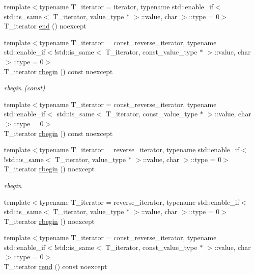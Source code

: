 \begin{DoxyCompactItemize}
{\footnotesize template$<$typename T\+\_\+iterator  = iterator, typename std\+::enable\+\_\+if$<$ std\+::is\+\_\+same$<$ T\+\_\+iterator, value\+\_\+type $\ast$ $>$\+::value, char $>$\+::type  = 0$>$ }\\T\+\_\+iterator \hyperlink{classIceBRG_1_1labeled__array__col__reference_a6a658c030fd15dc17e39542b80b78d4c}{end} () noexcept
\item 
{\footnotesize template$<$typename T\+\_\+iterator  = const\+\_\+reverse\+\_\+iterator, typename std\+::enable\+\_\+if$<$!std\+::is\+\_\+same$<$ T\+\_\+iterator, const\+\_\+value\+\_\+type $\ast$ $>$\+::value, char $>$\+::type  = 0$>$ }\\T\+\_\+iterator \hyperlink{classIceBRG_1_1labeled__array__col__reference_af2361ee6bb59b591e6df0149de8cede6}{rbegin} () const  noexcept
\begin{DoxyCompactList}\small\item\em rbegin (const) \end{DoxyCompactList}\item 
{\footnotesize template$<$typename T\+\_\+iterator  = const\+\_\+reverse\+\_\+iterator, typename std\+::enable\+\_\+if$<$ std\+::is\+\_\+same$<$ T\+\_\+iterator, const\+\_\+value\+\_\+type $\ast$ $>$\+::value, char $>$\+::type  = 0$>$ }\\T\+\_\+iterator \hyperlink{classIceBRG_1_1labeled__array__col__reference_af2361ee6bb59b591e6df0149de8cede6}{rbegin} () const  noexcept
\item 
{\footnotesize template$<$typename T\+\_\+iterator  = reverse\+\_\+iterator, typename std\+::enable\+\_\+if$<$!std\+::is\+\_\+same$<$ T\+\_\+iterator, value\+\_\+type $\ast$ $>$\+::value, char $>$\+::type  = 0$>$ }\\T\+\_\+iterator \hyperlink{classIceBRG_1_1labeled__array__col__reference_abaf079140281932aa7abdea39d6555c1}{rbegin} () noexcept
\begin{DoxyCompactList}\small\item\em rbegin \end{DoxyCompactList}\item 
{\footnotesize template$<$typename T\+\_\+iterator  = reverse\+\_\+iterator, typename std\+::enable\+\_\+if$<$ std\+::is\+\_\+same$<$ T\+\_\+iterator, value\+\_\+type $\ast$ $>$\+::value, char $>$\+::type  = 0$>$ }\\T\+\_\+iterator \hyperlink{classIceBRG_1_1labeled__array__col__reference_abaf079140281932aa7abdea39d6555c1}{rbegin} () noexcept
\item 
{\footnotesize template$<$typename T\+\_\+iterator  = const\+\_\+reverse\+\_\+iterator, typename std\+::enable\+\_\+if$<$!std\+::is\+\_\+same$<$ T\+\_\+iterator, const\+\_\+value\+\_\+type $\ast$ $>$\+::value, char $>$\+::type  = 0$>$ }\\T\+\_\+iterator \hyperlink{classIceBRG_1_1labeled__array__col__reference_aea119e7ca31efc687e57ede7f9e663dc}{rend} () const  noexcept

\end{DoxyCompactItemize}
